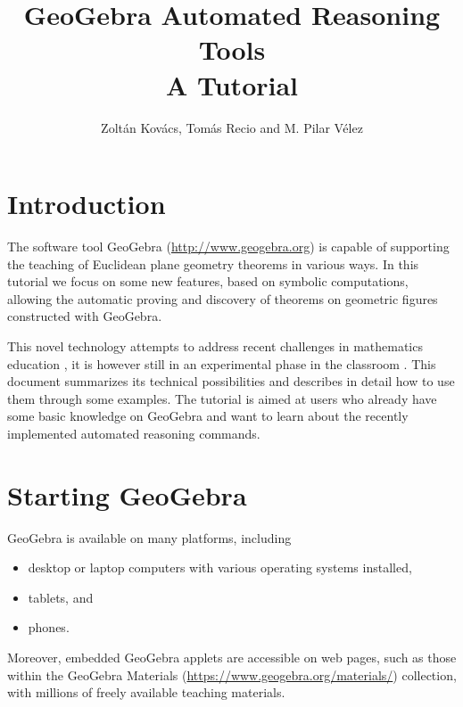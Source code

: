 \documentclass{article}
\title{GeoGebra Automated Reasoning Tools\\ \large A Tutorial}
\author{Zolt\'an Kov\'acs, Tom\'as Recio and M. Pilar V\'elez}
\begin{document}

\maketitle

\section{Introduction}

The software tool GeoGebra (\url{http://www.geogebra.org}) is capable of supporting the teaching of Euclidean plane geometry theorems in various ways. In this tutorial we focus on some new features, based on symbolic computations,  allowing the automatic proving and discovery of theorems on geometric figures constructed with GeoGebra.

This novel technology attempts to address recent challenges
in mathematics education \cite{HowsonWilson,Davis,SinclairBartoliniBussiDeVilliersOwens,Quaresma,RichardOllerMeavilla},
it is however still in an experimental phase in the classroom \cite{KovacsRecioRichardVelez,Kovacs2017}.
This document summarizes its technical possibilities and describes in detail how to use them through some examples. The tutorial is aimed at users who already
have some basic knowledge on GeoGebra and want to learn about the recently implemented automated reasoning commands.

\section{Starting GeoGebra}

GeoGebra is available on many platforms, including
\begin{itemize}
    \item desktop or laptop computers with various operating systems installed,
    \item tablets, and
    \item phones.
\end{itemize}
Moreover, embedded GeoGebra applets are accessible on web pages, such as those within the GeoGebra Materials (\url{https://www.geogebra.org/materials/}) collection, with millions of freely available teaching materials.
\end{document}

